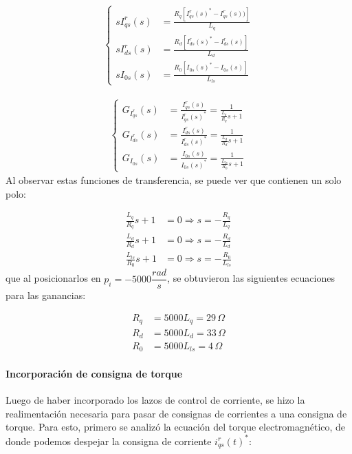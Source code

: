 \documentclass[a4paper, 10pt, onecolumn,journal]{ieeeconf}
\begin{document}
\begin{align}
	\begin{cases}
		s{I}^r_{qs}(s) &= \frac{ R_q \left[ {I^r_{qs}(s)}^* - I^r_{qs}(s))\right]}{L_q}\\
		s{I}^r_{ds}(s) &= \frac{R_d \left[ {I^r_{ds}(s)}^* - I^r_{ds}(s) \right]}{L_d} \\ 
		s{I}_{0s}(s)   &= \frac{R_0 \left[ {I_{0s}(s)}^* - I_{0s}(s) \right]}{L_{ls}}
	\end{cases}	\label{Ecuaciones Laplace lazos de control de corriente}
\end{align}

\begin{align}
	\begin{cases}
		G_{{I}^r_{qs}}(s) &=\frac{{I}^r_{qs}(s)}{{I^r_{qs}(s)}^*} =\frac{1}{\frac{L_q}{R_q} s + 1}\\
		G_{{I}^r_{ds}}(s) &=\frac{{I}^r_{ds}(s)}{{I^r_{ds}(s)}^*} = \frac{1}{\frac{L_d}{R_d} s + 1}\\ 
		G_{{I}_{0s}}(s)   &=\frac{{I}_{0s}(s)}{{I_{0s}(s)}^*} = \frac{1}{\frac{L_{ls}}{R_0} s + 1}
	\end{cases}	\label{Funciones de Transferencia de lazos de control de corriente}
\end{align}
Al observar estas funciones de transferencia, se puede ver que contienen un solo polo:

\begin{align}
	\frac{L_q}{R_q} s + 1 &= 0 \Rightarrow s = -\frac{R_q}{L_q}\\
	\frac{L_{d}}{R_d} s + 1 &=0 \Rightarrow s = -\frac{R_d}{L_d}\\ 
	\frac{L_{ls}}{R_0} s + 1  &=0 \Rightarrow s = -\frac{R_0}{L_{ls}}
\end{align}
que al posicionarlos en $p_{i}=-5000\dfrac{rad}{s}$, se obtuvieron las siguientes ecuaciones para las ganancias:

\begin{align}
	R_q &= 5000 L_q = 29 \, \Omega\\
	R_d &= 5000 L_d = 33 \, \Omega\\ 
	R_0 &= 5000 L_{ls} = 4 \, \Omega
\end{align}

\paragraph{\textbf{Incorporación de consigna de torque}}
Luego de haber incorporado los lazos de control de corriente, se hizo la realimentación necesaria para pasar de consignas de corrientes a una consigna de torque. Para esto, primero se analizó la ecuación del torque electromagnético, de donde podemos despejar la consigna de corriente ${i^r_{qs}(t)}^*$:
\end{document}
